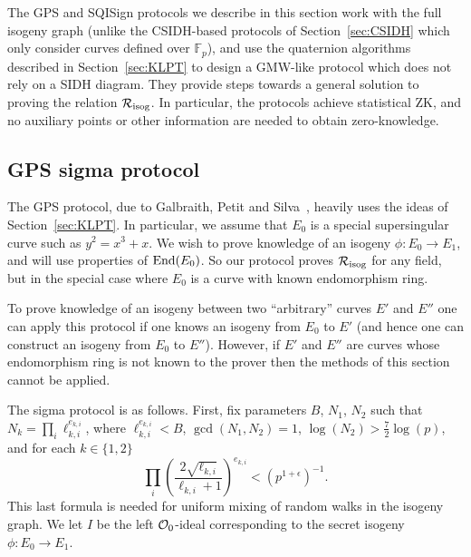 The GPS and SQISign protocols we describe in this section work with the full isogeny graph (unlike the CSIDH-based protocols of Section~\ref{sec:CSIDH} which only consider curves defined over $\mathbb{F}_p$), and use the quaternion algorithms described in Section~\ref{sec:KLPT} to design a GMW-like protocol which does not rely on a SIDH diagram. 
They provide steps towards a general solution to proving the relation $\R[isog]$.
In particular, the protocols achieve statistical ZK, and no auxiliary points or other information are needed to obtain zero-knowledge.



\subsection{GPS sigma protocol} \label{sec:GPSproof}




The GPS protocol, due to Galbraith, Petit and Silva~\cite{GPS20},  heavily uses the ideas of Section~\ref{sec:KLPT}. In particular, we assume that $E_0$ is a special supersingular curve such as $y^2 = x^3 + x$.
We wish to prove knowledge of an isogeny $\phi : E_0 \to E_1$, and will use properties of $\End(E_0)$.
So our protocol proves $\R[isog]$ for any field, but in the special case where $E_0$ is a curve with known endomorphism ring.

To prove knowledge of an isogeny between two ``arbitrary'' curves $E'$ and $E''$ one can apply this protocol if one knows an isogeny from $E_0$ to $E'$ (and hence one can construct an isogeny from $E_0$ to $E''$).
However, if $E'$ and $E''$ are curves whose endomorphism ring is not known to the prover then the methods of this section cannot be applied.

The sigma protocol is as follows.
First, fix parameters $B$, $N_1$, $N_2$ such that $N_k =\prod_i\ell_{k,i}^{e_{k,i}}$, where $\ell_{k,i}^{e_{k,i}}<B$, $\gcd(N_1,N_2)=1$, $\log(N_2) > \tfrac{7}{2} \log(p)$, and for each $k \in \{1,2\}$
\[
  \prod_i\left(\frac{2\sqrt{\ell_{k,i}}}{\ell_{k,i}+1}\right)^{e_{k,i}}<(p^{1+\epsilon})^{-1}. 
\]
This last formula is needed for uniform mixing of random walks in the isogeny graph.
We let $I$ be the left $\OO_0$-ideal corresponding to the secret isogeny $\phi : E_0 \to E_1$.

